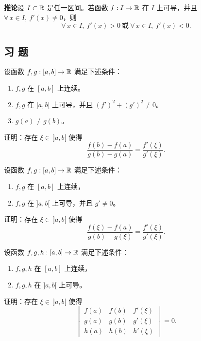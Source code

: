 \textbf{推论}\quad 设 \(I\subset\mathbb{R}\) 是任一区间。若函数 \(f:I\to\mathbb{R}\) 在 \(I\) 上可导，并且 \(\forall\,x\in I,\ f'(x)\neq0\)，则
\[
\forall\,x\in I,\ f'(x)>0\ \text{或}\ \forall\,x\in I,\ f'(x)<0.
\]

\subsection*{习 题}

\begin{exercise}
	\item 设函数 \(f,g:[a,b]\to\mathbb{R}\) 满足下述条件：
	\begin{enumerate}[label=\arabic*)]
		\item \(f,g\) 在 \([a,b]\) 上连续。
		\item \(f,g\) 在 \(]a,b[\) 上可导，并且 \((f')^2+(g')^2\neq0\)。
		\item \(g(a)\neq g(b)\)。
	\end{enumerate}
	证明：存在 \(\xi\in\ ]a,b[\) 使得
	\[
	\frac{f(b)-f(a)}{g(b)-g(a)}=\frac{f'(\xi)}{g'(\xi)}.
	\]
\end{exercise}

\begin{exercise}
	\item 设函数 \(f,g:[a,b]\to\mathbb{R}\) 满足下述条件：
	\begin{enumerate}[label=\arabic*)]
		\item \(f,g\) 在 \([a,b]\) 上连续，
		\item \(f,g\) 在 \(]a,b[\) 上可导，并且 \(g'\neq0\)。
	\end{enumerate}
	证明：存在 \(\xi\in\ ]a,b[\) 使得
	\[
	\frac{f(\xi)-f(a)}{g(b)-g(\xi)}=\frac{f'(\xi)}{g'(\xi)}.
	\]
\end{exercise}

\begin{exercise}
	\item 设函数 \(f,g,h:[a,b]\to\mathbb{R}\) 满足下述条件：
	\begin{enumerate}[label=\arabic*)]
		\item \(f,g,h\) 在 \([a,b]\) 上连续，
		\item \(f,g,h\) 在 \(]a,b[\) 上可导。
	\end{enumerate}
	证明：存在 \(\xi\in\ ]a,b[\) 使得
	\[
	\begin{vmatrix} f(a) & f(b) & f'(\xi) \\ g(a) & g(b) & g'(\xi) \\ h(a) & h(b) & h'(\xi) \end{vmatrix}=0.
	\]
\end{exercise}

